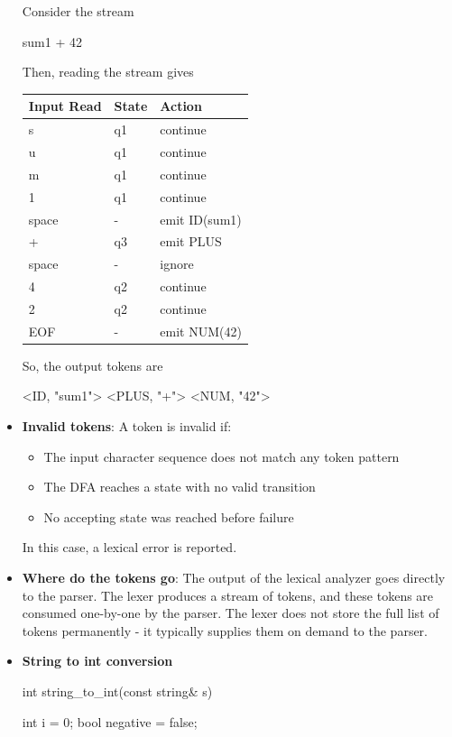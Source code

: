 \documentclass{report}
\begin{document}
\begin{itemize}
\begin{center}
            \end{center}
            Consider the stream
            \begin{cppcode}
                sum1 + 42
            \end{cppcode}
            \bigbreak \noindent 
            Then, reading the stream gives
            \begin{center}
                \begin{tabularx}{\textwidth}{@{}XXX@{}}
                    \toprule
                    \textbf{Input Read} &	\textbf{State} &	\textbf{Action} \\
                    \midrule
                    s&	q1	&continue\\[2ex]
                    u&	q1	&continue\\[2ex]
                    m&	q1	&continue\\[2ex]
                    1&	q1	&continue\\[2ex]
                    space& -	&emit ID(sum1)\\[2ex]
                    +&	q3	&emit PLUS\\[2ex]
                    space& -	&ignore\\[2ex]
                    4& q2	&continue\\[2ex]
                    2& 	q2	&continue\\[2ex]
                    EOF&	-	&emit NUM(42) \\
                    \bottomrule
                \end{tabularx}
            \end{center}
            So, the output tokens are
            \bigbreak \noindent 
            \begin{cppcode}
                <ID, "sum1">
                <PLUS, "+">
                <NUM, "42">
            \end{cppcode}
        \item \textbf{Invalid tokens}: A token is invalid if:
            \begin{itemize}
                \item The input character sequence does not match any token pattern
                \item The DFA reaches a state with no valid transition
                \item No accepting state was reached before failure
            \end{itemize}
            In this case, a lexical error is reported.
        \item \textbf{Where do the tokens go}:  The output of the lexical analyzer goes directly to the parser. The lexer produces a stream of tokens, and these tokens are consumed one-by-one by the parser. The lexer does not store the full list of tokens permanently - it typically supplies them on demand to the parser.
        \item \textbf{String to int conversion}
            \bigbreak \noindent 
            \begin{cppcode}
                int string_to_int(const string& s) {
                    int i = 0;
                    bool negative = false;

}
\end{cppcode}
\end{itemize}
\end{document}
